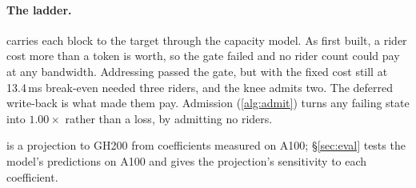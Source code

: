 \paragraph{The ladder.}  carries each block to the target
through the capacity model. As first built, a rider cost more than a token is
worth, so the gate failed and no rider count could pay at any bandwidth.
Addressing passed the gate, but with the fixed cost still at 13.4\,ms
break-even needed three riders, and the knee admits two. The deferred write-back is what made
them pay. Admission (\cref{alg:admit}) turns any failing state into $1.00\times$
rather than a loss, by admitting no riders.

 is a projection to GH200 from coefficients measured on A100;
\S\ref{sec:eval} tests the model's predictions on A100 and gives the
projection's sensitivity to each coefficient.
